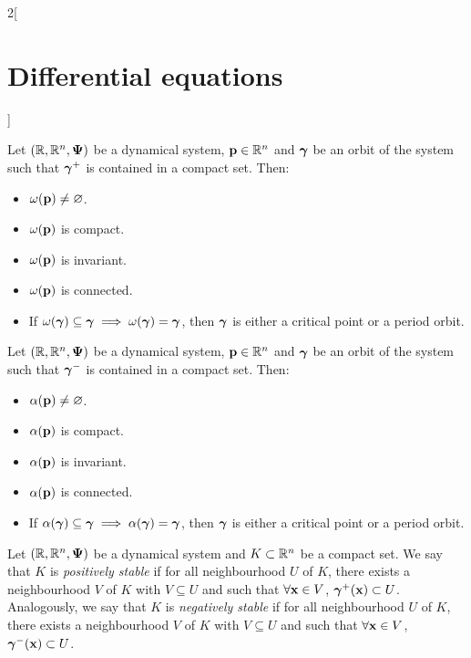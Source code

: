 \documentclass[../../../main_math.tex]{subfiles}
\begin{document}
\begin{multicols}{2}[\section{Differential equations}]
\begin{definition}
  \end{definition}
  \begin{proposition}
    Let $(\mathbb{R},\mathbb{R}^n,\boldsymbol{\mathrm{\Psi}})$ be a dynamical system, $\boldsymbol{\mathrm{p}}\in \mathbb{R}^n$ and $\boldsymbol{\mathrm{\gamma}}$ be an orbit of the system such that ${\boldsymbol{\mathrm{\gamma}}}^+$ is contained in a compact set. Then:
    \begin{itemize}
      \item $\omega(\boldsymbol{\mathrm{p}})\ne\varnothing$.
      \item $\omega(\boldsymbol{\mathrm{p}})$ is compact.
      \item $\omega(\boldsymbol{\mathrm{p}})$ is invariant.
      \item $\omega(\boldsymbol{\mathrm{p}})$ is connected.
      \item If $\omega(\boldsymbol{\mathrm{\gamma}})\subseteq\boldsymbol{\mathrm{\gamma}}\implies\omega(\boldsymbol{\mathrm{\gamma}})=\boldsymbol{\mathrm{\gamma}}$, then $\boldsymbol{\mathrm{\gamma}}$ is either a critical point or a period orbit.
    \end{itemize}
  \end{proposition}
  \begin{proposition}
    Let $(\mathbb{R},\mathbb{R}^n,\boldsymbol{\mathrm{\Psi}})$ be a dynamical system, $\boldsymbol{\mathrm{p}}\in \mathbb{R}^n$ and $\boldsymbol{\mathrm{\gamma}}$ be an orbit of the system such that ${\boldsymbol{\mathrm{\gamma}}}^-$ is contained in a compact set. Then:
    \begin{itemize}
      \item $\alpha(\boldsymbol{\mathrm{p}})\ne\varnothing$.
      \item $\alpha(\boldsymbol{\mathrm{p}})$ is compact.
      \item $\alpha(\boldsymbol{\mathrm{p}})$ is invariant.
      \item $\alpha(\boldsymbol{\mathrm{p}})$ is connected.
      \item If $\alpha(\boldsymbol{\mathrm{\gamma}})\subseteq\boldsymbol{\mathrm{\gamma}}\implies\alpha(\boldsymbol{\mathrm{\gamma}})=\boldsymbol{\mathrm{\gamma}}$, then $\boldsymbol{\mathrm{\gamma}}$ is either a critical point or a period orbit.
    \end{itemize}
  \end{proposition}
  \begin{definition}
    Let $(\mathbb{R},\mathbb{R}^n,\boldsymbol{\mathrm{\Psi}})$ be a dynamical system and $K\subset \mathbb{R}^n$ be a compact set. We say that $K$ is \emph{positively stable} if for all neighbourhood $U$ of $K$, there exists a neighbourhood $V$ of $K$ with $V\subseteq U$ and such that $\forall \boldsymbol{\mathrm{x}}\in V$, ${\boldsymbol{\mathrm{\gamma}}}^+(\boldsymbol{\mathrm{x}})\subset U$. Analogously, we say that $K$ is \emph{negatively stable} if for all neighbourhood $U$ of $K$, there exists a neighbourhood $V$ of $K$ with $V\subseteq U$ and such that $\forall \boldsymbol{\mathrm{x}}\in V$, ${\boldsymbol{\mathrm{\gamma}}}^-(\boldsymbol{\mathrm{x}})\subset U$.
  \end{definition}

\end{multicols}
\end{document}
